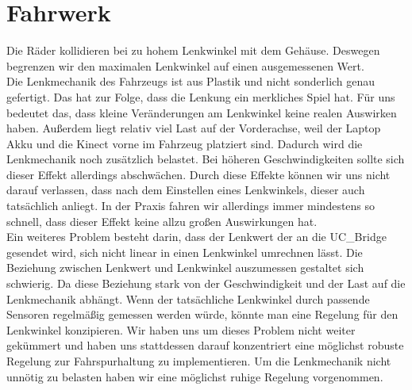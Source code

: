 \section{Fahrwerk}
\label{sec:fahrwerk}
Die Räder kollidieren bei zu hohem Lenkwinkel mit dem Gehäuse.
Deswegen begrenzen wir den maximalen Lenkwinkel auf einen ausgemessenen Wert.
\\
Die Lenkmechanik des Fahrzeugs ist aus Plastik und nicht sonderlich genau gefertigt.
Das hat zur Folge, dass die Lenkung ein merkliches Spiel hat. 
Für uns bedeutet das, dass kleine Veränderungen am Lenkwinkel keine realen Auswirken haben. 
Außerdem liegt relativ viel Last auf der Vorderachse, weil der Laptop Akku und die Kinect vorne im Fahrzeug platziert sind.
Dadurch wird die Lenkmechanik noch zusätzlich belastet.
Bei höheren Geschwindigkeiten sollte sich dieser Effekt allerdings abschwächen. 
Durch diese Effekte können wir uns nicht darauf verlassen, dass nach dem Einstellen eines Lenkwinkels, dieser auch tatsächlich anliegt.
In der Praxis fahren wir allerdings immer mindestens so schnell, dass dieser Effekt keine allzu großen Auswirkungen hat.
\\
Ein weiteres Problem besteht darin, dass der Lenkwert der an die UC\_Bridge gesendet wird, sich nicht linear in einen Lenkwinkel umrechnen lässt.
Die Beziehung zwischen Lenkwert und Lenkwinkel auszumessen gestaltet sich schwierig.
Da diese Beziehung stark von der Geschwindigkeit und der Last auf die Lenkmechanik abhängt.
Wenn der tatsächliche Lenkwinkel durch passende Sensoren regelmäßig gemessen werden würde, könnte man eine Regelung für den Lenkwinkel konzipieren.
Wir haben uns um dieses Problem nicht weiter gekümmert und haben uns stattdessen darauf konzentriert eine möglichst robuste Regelung zur Fahrspurhaltung zu implementieren.
Um die Lenkmechanik nicht unnötig zu belasten haben wir eine möglichst ruhige Regelung vorgenommen.




